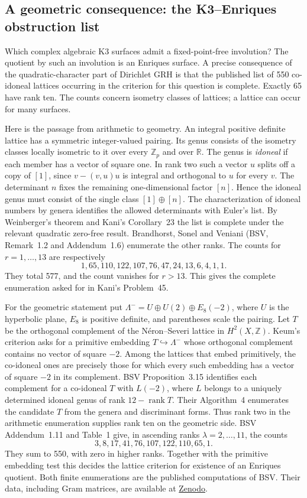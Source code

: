 \documentclass[11pt]{article}
\begin{document}
\subsection*{A geometric consequence: the K3--Enriques obstruction list}
Which complex algebraic K3 surfaces admit a fixed-point-free involution?
The quotient by such an involution is an Enriques surface. A precise consequence
of the quadratic-character part of Dirichlet GRH is that the published list of
550 co-idoneal lattices occurring in the criterion for this question is complete.
Exactly 65 have rank ten. The counts concern isometry classes of lattices;
a lattice can occur for many surfaces.

Here is the passage from arithmetic to geometry. An integral positive definite
lattice has a symmetric integer-valued pairing. Its genus consists of the
isometry classes locally isometric to it over every $\mathbb Z_p$ and over
$\mathbb R$. The genus is \emph{idoneal} if each member has a vector of
square one. In rank two such a vector $u$ splits off a copy of $[1]$, since
$v-(v,u)u$ is integral and orthogonal to $u$ for every $v$. The determinant
$n$ fixes the remaining one-dimensional factor $[n]$. Hence the idoneal genus
must consist of the single class $[1]\oplus[n]$. The characterization of
idoneal numbers by genera identifies the allowed determinants with Euler's
list. By Weinberger's theorem and Kani's Corollary~23 the list is complete
under the relevant quadratic zero-free result. Brandhorst, Sonel and Veniani
(BSV, Remark~1.2 and Addendum~1.6) enumerate the other ranks. The counts for
$r=1,\dots,13$ are respectively
\[
1,65,110,122,107,76,47,24,13,6,4,1,1.
\]
They total 577, and the count vanishes for $r>13$. This gives the complete
enumeration asked for in Kani's Problem~45.

For the geometric statement put
$\Lambda^-=U\oplus U(2)\oplus E_8(-2)$, where $U$ is the hyperbolic
plane, $E_8$ is positive definite, and parentheses scale the pairing.
Let $T$ be the orthogonal complement of the N\'eron--Severi lattice in
$H^2(X,\mathbb Z)$. Keum's criterion asks for a primitive embedding
$T\hookrightarrow\Lambda^-$ whose orthogonal complement contains no vector
of square $-2$. Among the lattices that embed primitively, the co-idoneal
ones are precisely those for which every such embedding has a vector of
square $-2$ in its complement. BSV Proposition~3.15 identifies each
complement for a co-idoneal $T$ with $L(-2)$, where $L$ belongs to a
uniquely determined idoneal genus of rank $12-\operatorname{rank}T$. Their
Algorithm~4 enumerates the candidate $T$ from the genera and discriminant
forms. Thus rank two in the arithmetic enumeration supplies rank ten on the
geometric side. BSV Addendum~1.11 and Table~1 give, in ascending ranks
$\lambda=2,\ldots,11$, the counts
\[
3,8,17,41,76,107,122,110,65,1.
\]
They sum to 550, with zero in higher ranks. Together with the primitive
embedding test this decides the lattice criterion for existence of an Enriques
quotient. Both finite enumerations are the published computations of BSV.
Their data, including Gram matrices, are available at
\href{https://doi.org/10.5281/zenodo.10617125}{Zenodo}.
\end{document}
